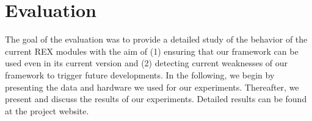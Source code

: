 \documentclass{llncs}
\begin{document}




\section{Evaluation}
\label{sec:evaluation}
The goal of the evaluation was to provide a detailed study of the behavior of the current REX modules with the aim of (1) ensuring that our framework can be used even in its current version and (2) detecting current weaknesses of our framework to trigger future developments.
In the following, we begin by presenting the data and hardware we used for our experiments. 
Thereafter, we present and discuss the results of our experiments.
Detailed results can be found at the project website.
\end{document}
